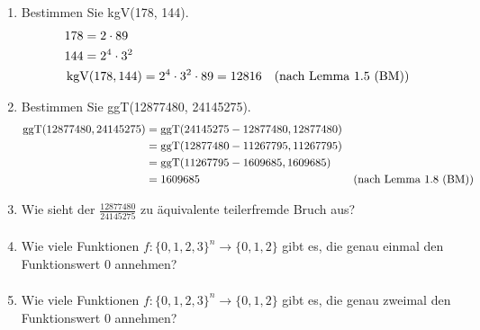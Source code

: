 \begin{enumerate}[label=(\alph*)]
		\item Bestimmen Sie kgV(178, 144).
		\begin{align*}
			& 178 = 2\cdot89 \\
			& 144 = 2^4\cdot3^2 \\
			&\operatorname{kgV}(178, 144) = 2^4\cdot3^2\cdot89 = 12816
		 	&\textrm{(nach Lemma 1.5 (BM))}
		\end{align*}

		\item Bestimmen Sie ggT(12877480, 24145275).
		\begin{align*}
			\operatorname{ggT}(12877480, 24145275) &= \operatorname{ggT}(24145275-12877480, 12877480)
			\\& = \operatorname{ggT}(12877480-11267795,11267795)
			\\& = \operatorname{ggT}(11267795-1609685,1609685)
			\\& = 1609685
		 	&\textrm{(nach Lemma 1.8 (BM))}
		\end{align*}

		\item Wie sieht der $\frac{12877480}{24145275}$ zu äquivalente teilerfremde Bruch aus?
		\begin{align*}
		\end{align*}

		\item Wie viele Funktionen $f : \{0, 1, 2, 3\}^n \to \{0, 1, 2\}$ gibt es, die genau einmal den Funktionswert 0 annehmen?
		\begin{align*}
		\end{align*}

		\item Wie viele Funktionen $f : \{0, 1, 2, 3\}^n \to \{0, 1, 2\}$ gibt es, die genau zweimal den Funktionswert 0 annehmen?
		\begin{align*}
		\end{align*}
		
	\end{enumerate} 
	
